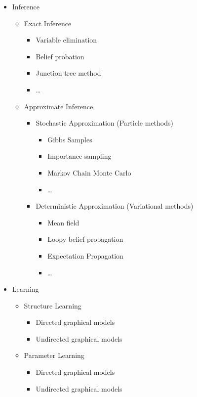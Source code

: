 \begin{itemize}
\item Inference
  \begin{itemize}
  \item Exact Inference
    \begin{itemize}
    \item Variable elimination
    \item Belief probation
    \item Junction tree method
    \item \ldots
    \end{itemize}
    
  \item Approximate Inference
    \begin{itemize}
    \item Stochastic Approximation (Particle methods)
      \begin{itemize}
      \item Gibbs Samples
      \item Importance sampling
      \item Markov Chain Monte Carlo
      \item \ldots
      \end{itemize}
      
    \item Deterministic Approximation (Variational methods)
      \begin{itemize}
      \item Mean field
      \item Loopy belief propagation
      \item Expectation Propagation
      \item \ldots
      \end{itemize}
    \end{itemize}
  \end{itemize}
  
\item Learning
  \begin{itemize}
  \item Structure Learning
    \begin{itemize}
    \item Directed graphical models
    \item Undirected graphical models
    \end{itemize}
    
  \item Parameter Learning
    \begin{itemize}
    \item Directed graphical models
    \item Undirected graphical models
    \end{itemize}
  \end{itemize}
\end{itemize}

